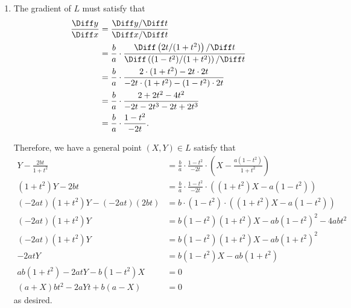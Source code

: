 \begin{enumerate}
    \item The gradient of \(L\) must satisfy that
          \begin{align*}
              \frac{\Diff y}{\Diff x} & = \frac{\Diff y / \Diff t}{\Diff x / \Diff t}                                                                    \\
                                      & = \frac{b}{a} \cdot \frac{\Diff \left(2t/(1+t^2)\right) / \Diff t}{\Diff \left((1-t^2)/(1+t^2)\right) / \Diff t} \\
                                      & = \frac{b}{a} \cdot \frac{2 \cdot (1+t^2) - 2t \cdot 2t}{-2t \cdot (1+t^2) - (1-t^2) \cdot 2t}                   \\
                                      & = \frac{b}{a} \cdot \frac{2 + 2t^2 - 4t^2}{-2t - 2t^3 - 2t + 2t^3}                                               \\
                                      & = \frac{b}{a} \cdot \frac{1 - t^2}{-2t}.
          \end{align*}

          Therefore, we have a general point \((X, Y) \in L\) satisfy that
          \begin{align*}
              Y - \frac{2bt}{1+t^2}        & = \frac{b}{a} \cdot \frac{1 - t^2}{-2t} \cdot \left(X - \frac{a(1-t^2)}{1+t^2}\right) \\
              (1+t^2)Y - 2bt               & = \frac{b}{a} \cdot \frac{1-t^2}{-2t} \cdot \left((1+t^2)X - a(1-t^2)\right)          \\
              (-2at)(1+t^2)Y - (-2at)(2bt) & = b \cdot (1-t^2) \cdot \left((1+t^2)X - a(1-t^2)\right)                              \\
              (-2at)(1+t^2)Y               & = b(1-t^2)(1+t^2)X - ab(1-t^2)^2 - 4abt^2                                             \\
              (-2at)(1+t^2)Y               & = b(1-t^2)(1+t^2)X - ab(1+t^2)^2                                                      \\
              -2atY                        & = b(1-t^2)X - ab(1+t^2)                                                               \\
              ab(1+t^2) -2atY - b(1-t^2)X  & = 0                                                                                   \\
              (a + X)bt^2 - 2aYt + b(a-X)  & = 0
          \end{align*}
          as desired.


\end{enumerate}
